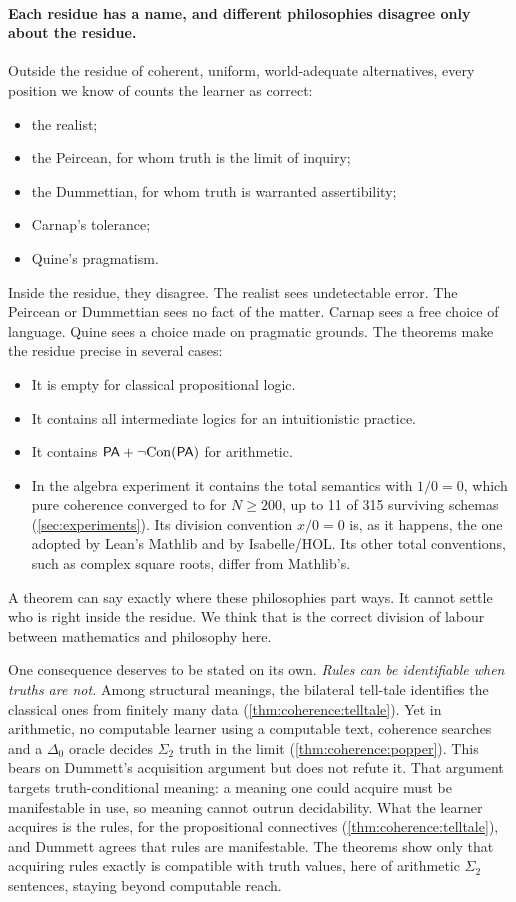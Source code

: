 \paragraph{Each residue has a name, and different philosophies disagree only about the residue.}
Outside the residue of coherent, uniform, world-adequate alternatives, every position we know of counts the learner as correct:
\begin{itemize}
\item the realist;
\item the Peircean, for whom truth is the limit of inquiry;
\item the Dummettian, for whom truth is warranted assertibility;
\item Carnap's tolerance;
\item Quine's pragmatism.
\end{itemize}
Inside the residue, they disagree. The realist sees undetectable error. The Peircean or Dummettian sees no fact of the matter. Carnap sees a free choice of language. Quine sees a choice made on pragmatic grounds. The theorems make the residue precise in several cases:
\begin{itemize}
\item It is empty for classical propositional logic.
\item It contains all intermediate logics for an intuitionistic practice.
\item It contains $\mathsf{PA}+\neg\mathrm{Con}(\mathsf{PA})$ for arithmetic.
\item In the algebra experiment it contains the total semantics with $1/0=0$, which pure coherence converged to for $N\ge200$, up to 11 of 315 surviving schemas (\cref{sec:experiments}). Its division convention $x/0=0$ is, as it happens, the one adopted by Lean's Mathlib and by Isabelle/HOL. Its other total conventions, such as complex square roots, differ from Mathlib's.
\end{itemize}
A theorem can say exactly where these philosophies part ways. It cannot settle who is right inside the residue. We think that is the correct division of labour between mathematics and philosophy here.

One consequence deserves to be stated on its own. \emph{Rules can be identifiable when truths are not.} Among structural meanings, the bilateral tell-tale identifies the classical ones from finitely many data (\cref{thm:coherence:telltale}). Yet in arithmetic, no computable learner using a computable text, coherence searches and a $\Delta_0$ oracle decides $\Sigma_2$ truth in the limit (\cref{thm:coherence:popper}). This bears on Dummett's acquisition argument but does not refute it. That argument targets truth-conditional meaning: a meaning one could acquire must be manifestable in use, so meaning cannot outrun decidability. What the learner acquires is the rules, for the propositional connectives (\cref{thm:coherence:telltale}), and Dummett agrees that rules are manifestable. The theorems show only that acquiring rules exactly is compatible with truth values, here of arithmetic $\Sigma_2$ sentences, staying beyond computable reach.

